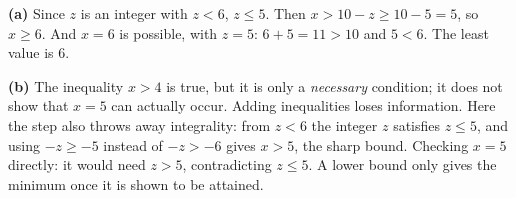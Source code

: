 \textbf{(a)} Since $z$ is an integer with $z<6$, $z\le5$. Then $x>10-z\ge10-5=5$, so $x\ge6$. And $x=6$ is possible, with $z=5$: $6+5=11>10$ and $5<6$. The least value is $\boxed{6}$.

\textbf{(b)} The inequality $x>4$ is true, but it is only a \emph{necessary} condition; it does not show that $x=5$ can actually occur. Adding inequalities loses information. Here the step also throws away integrality: from $z<6$ the integer $z$ satisfies $z\le5$, and using $-z\ge-5$ instead of $-z>-6$ gives $x>5$, the sharp bound. Checking $x=5$ directly: it would need $z>5$, contradicting $z\le5$. A lower bound only gives the minimum once it is shown to be attained.
